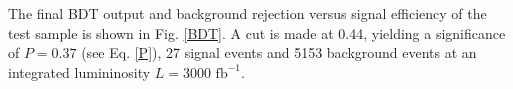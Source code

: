 \documentclass[10pt,a4paper]{article}
\begin{document}
The final BDT output and background rejection versus signal efficiency of the test sample is shown in Fig. \ref{BDT}. A cut is made at 0.44, yielding a significance of $P=0.37$ (see Eq. \eqref{P}), 27 signal events and 5153 background events at an integrated lumininosity $L = 3000 \text{ fb}^{-1}$.


\end{document}
